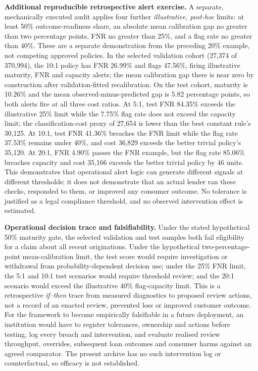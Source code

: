\documentclass[10pt]{article}
\begin{document}
\noindent\textbf{Additional reproducible retrospective alert exercise.} A separate, mechanically executed audit applies four further \emph{illustrative, post-hoc} limits: at least 50\% outcome-readiness share, an absolute mean calibration gap no greater than two percentage points, FNR no greater than 25\%, and a flag rate no greater than 40\%. These are a separate demonstration from the preceding 20\% example, not competing approved policies. In the selected validation cohort (27,374 of 370,994), the 10:1 policy has FNR 26.99\% and flags 47.56\%, firing illustrative maturity, FNR and capacity alerts; the mean calibration gap there is near zero by construction after validation-fitted recalibration. On the test cohort, maturity is 10.26\% and the mean observed-minus-predicted gap is 5.82 percentage points, so both alerts fire at all three cost ratios. At 5:1, test FNR 84.35\% exceeds the illustrative 25\% limit while the 7.75\% flag rate does not exceed the capacity limit; the classification-cost proxy of 27,654 is lower than the best constant rule's 30,125. At 10:1, test FNR 41.36\% breaches the FNR limit while the flag rate 37.53\% remains under 40\%, and cost 36,829 exceeds the better trivial policy's 35,120. At 20:1, FNR 4.90\% passes the FNR example, but the flag rate 85.06\% breaches capacity and cost 35,166 exceeds the better trivial policy by 46 units. This demonstrates that operational alert logic can generate different signals at different thresholds; it does not demonstrate that an actual lender ran these checks, responded to them, or improved any consumer outcome. No tolerance is justified as a legal compliance threshold, and no observed intervention effect is estimated.



\noindent\textbf{Operational decision trace and falsifiability.} Under the stated hypothetical 50\% maturity gate, the selected validation and test samples both fail eligibility for a claim about all recent originations. Under the hypothetical two-percentage-point mean-calibration limit, the test score would require investigation or withdrawal from probability-dependent decision use; under the 25\% FNR limit, the 5:1 and 10:1 test scenarios would require threshold review; and the 20:1 scenario would exceed the illustrative 40\% flag-capacity limit. This is a retrospective \emph{if--then} trace from measured diagnostics to proposed review actions, not a record of an enacted review, prevented loss or improved customer outcome. For the framework to become empirically falsifiable in a future deployment, an institution would have to register tolerances, ownership and actions before testing, log every breach and intervention, and evaluate realised review throughput, overrides, subsequent loan outcomes and consumer harms against an agreed comparator. The present archive has no such intervention log or counterfactual, so efficacy is not established.
\end{document}
